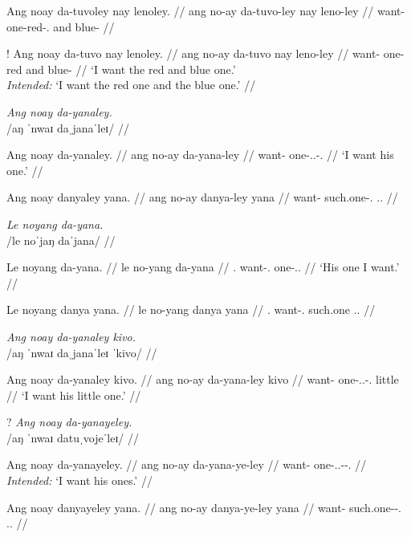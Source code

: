 \documentclass[12pt,a4paper]{scrartcl}
\newcommand{\PargI}{{\Parg}.{\Inan}}
\newcommand{\PatTI}{{\PatT}.{\Inan}}
\newcommand{\TsgM}{{\Tsg}.{\M}}
\begin{document}
\a\ljudge*\begingl
\gla Ang noay da-tuvoley nay lenoley. //
\glb ang no-ay da-tuvo-ley nay leno-ley //
\glc \AgtT{} want-\Fsg{} one-red-\PargI{} and blue-\Parg{} //
\endgl

\a\ljudge!\begingl
\gla Ang noay da-tuvo nay lenoley. //
\glb ang no-ay da-tuvo nay leno-ley //
\glc \AgtT{} want-\Fsg{} one-red and blue-\Parg{} //
\glft `I want the red and blue one.' \\
	\textit{Intended:} `I want the red one and the blue one.' //
\endgl

\xe

\pex
\a\begingl
\glpreamble \textit{Ang noay da-yanaley.} \\
	/aŋ ˈnwaɪ daˌjanaˈleɪ/ //

\gla Ang noay da-yanaley. //
\glb ang no-ay da-yana-ley //
\glc \AgtT{} want-\Fsg{} one-\TsgM{}.\Gen{}-\PargI{} //
\glft `I want his one.' //
\endgl

\a\begingl
\gla Ang noay danyaley yana. //
\glb ang no-ay danya-ley yana //
\glc \AgtT{} want-\Fsg{} such.one-\PargI{} \TsgM{}.\Gen{} //
\endgl

\xe

\pex
\a\begingl
\glpreamble \textit{Le noyang da-yana.} \\
	/le noˈjaŋ daˈjana/ //

\gla Le noyang da-yana. //
\glb le no-yang da-yana //
\glc \PatTI{} want-\Fsg{}.\Aarg{} one-\TsgM{}.\Gen{} //
\glft `His one I want.' //
\endgl

\a\begingl
\gla Le noyang danya yana. //
\glb le no-yang danya yana //
\glc \PatTI{} want-\Fsg{}.\Aarg{} such.one \TsgM{}.\Gen{} //
\endgl

\xe

\ex\begingl
\glpreamble \textit{Ang noay da-yanaley kivo.} \\
	/aŋ ˈnwaɪ daˌjanaˈleɪ ˈkivo/ //

\gla Ang noay da-yanaley kivo. //
\glb ang no-ay da-yana-ley kivo //
\glc \AgtT{} want-\Fsg{} one-\TsgM{}.\Gen{}-\PargI{} little //
\glft `I want his little one.' //
\endgl
\xe

\pex
\a\ljudge?\begingl
\glpreamble \textit{Ang noay da-yanayeley.} \\
	/aŋ ˈnwaɪ datuˌvojeˈleɪ/ //

\gla Ang noay da-yanayeley. //
\glb ang no-ay da-yana-ye-ley //
\glc \AgtT{} want-\Fsg{} one-\TsgM{}.\Gen{}-\Pl{}-\PargI{} //
\glft \textit{Intended:} `I want his ones.' //
\endgl

\a\ljudge*\begingl
\gla Ang noay danyayeley yana. //
\glb ang no-ay danya-ye-ley yana //
\glc \AgtT{} want-\Fsg{} such.one-\Pl{}-\PargI{} \TsgM{}.\Gen{} //
\endgl
\xe
\end{document}
